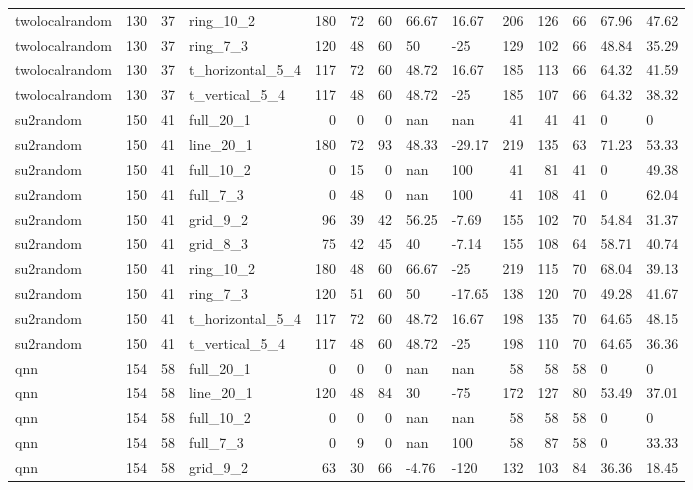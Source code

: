 \begin{longtable}{lrrlrrrllrrrll}
twolocalrandom & 130 & 37 & ring\_10\_2 & 180 & 72 & 60 & 66.67 & 16.67 & 206 & 126 & 66 & 67.96 & 47.62 \\
twolocalrandom & 130 & 37 & ring\_7\_3 & 120 & 48 & 60 & 50 & -25 & 129 & 102 & 66 & 48.84 & 35.29 \\
twolocalrandom & 130 & 37 & t\_horizontal\_5\_4 & 117 & 72 & 60 & 48.72 & 16.67 & 185 & 113 & 66 & 64.32 & 41.59 \\
twolocalrandom & 130 & 37 & t\_vertical\_5\_4 & 117 & 48 & 60 & 48.72 & -25 & 185 & 107 & 66 & 64.32 & 38.32 \\
su2random & 150 & 41 & full\_20\_1 & 0 & 0 & 0 & nan & nan & 41 & 41 & 41 & 0 & 0 \\
su2random & 150 & 41 & line\_20\_1 & 180 & 72 & 93 & 48.33 & -29.17 & 219 & 135 & 63 & 71.23 & 53.33 \\
su2random & 150 & 41 & full\_10\_2 & 0 & 15 & 0 & nan & 100 & 41 & 81 & 41 & 0 & 49.38 \\
su2random & 150 & 41 & full\_7\_3 & 0 & 48 & 0 & nan & 100 & 41 & 108 & 41 & 0 & 62.04 \\
su2random & 150 & 41 & grid\_9\_2 & 96 & 39 & 42 & 56.25 & -7.69 & 155 & 102 & 70 & 54.84 & 31.37 \\
su2random & 150 & 41 & grid\_8\_3 & 75 & 42 & 45 & 40 & -7.14 & 155 & 108 & 64 & 58.71 & 40.74 \\
su2random & 150 & 41 & ring\_10\_2 & 180 & 48 & 60 & 66.67 & -25 & 219 & 115 & 70 & 68.04 & 39.13 \\
su2random & 150 & 41 & ring\_7\_3 & 120 & 51 & 60 & 50 & -17.65 & 138 & 120 & 70 & 49.28 & 41.67 \\
su2random & 150 & 41 & t\_horizontal\_5\_4 & 117 & 72 & 60 & 48.72 & 16.67 & 198 & 135 & 70 & 64.65 & 48.15 \\
su2random & 150 & 41 & t\_vertical\_5\_4 & 117 & 48 & 60 & 48.72 & -25 & 198 & 110 & 70 & 64.65 & 36.36 \\
qnn & 154 & 58 & full\_20\_1 & 0 & 0 & 0 & nan & nan & 58 & 58 & 58 & 0 & 0 \\
qnn & 154 & 58 & line\_20\_1 & 120 & 48 & 84 & 30 & -75 & 172 & 127 & 80 & 53.49 & 37.01 \\
qnn & 154 & 58 & full\_10\_2 & 0 & 0 & 0 & nan & nan & 58 & 58 & 58 & 0 & 0 \\
qnn & 154 & 58 & full\_7\_3 & 0 & 9 & 0 & nan & 100 & 58 & 87 & 58 & 0 & 33.33 \\
qnn & 154 & 58 & grid\_9\_2 & 63 & 30 & 66 & -4.76 & -120 & 132 & 103 & 84 & 36.36 & 18.45 \\

\end{longtable}
